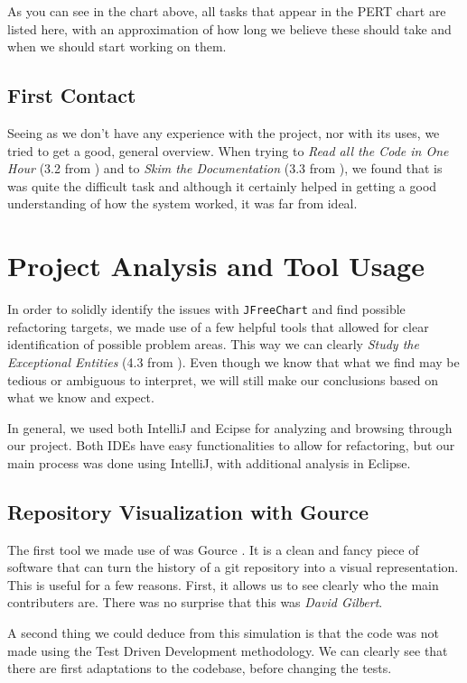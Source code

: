 \documentclass[11pt]{article}
\begin{document}
	As you can see in the chart above, all tasks that appear in the \textsf{PERT} chart are listed here, with an approximation of how long we believe these should take and when we should start working on them.
   
	
	\subsection{First Contact}
	Seeing as we don't have any experience with the project, nor with its uses, we tried to get a good, general overview. When trying to \textsl{Read all the Code in One Hour} (3.2 from \cite{demeyer2009object}) and to \textsl{Skim the Documentation} (3.3 from \cite{demeyer2009object}), we found that is was quite the difficult task and although it certainly helped in getting a good understanding of how the system worked, it was far from ideal.
	
	
	\section{Project Analysis and Tool Usage}
	In order to solidly identify the issues with \texttt{JFreeChart} and find possible refactoring targets, we made use of a few helpful tools that allowed for clear identification of possible problem areas. This way we can clearly \textsl{Study the Exceptional Entities} (4.3 from \cite{demeyer2009object}). Even though we know that what we find may be tedious or ambiguous to interpret, we will still make our conclusions based on what we know and expect.
	
	In general, we used both \textsf{IntelliJ} \cite{intellij} and \textsf{Ecipse} \cite{eclipse} for analyzing and browsing through our project. Both IDEs have easy functionalities to allow for refactoring, but our main process was done using \textsf{IntelliJ}, with additional analysis in \textsf{Eclipse}.
	
	\subsection{Repository Visualization with Gource}
	\label{sec:gource}
	The first tool we made use of was \textsf{Gource} \cite{gource}. It is a clean and fancy piece of software that can turn the history of a git repository into a visual representation. This is useful for a few reasons. First, it allows us to see clearly who the main contributers are. There was no surprise that this was \textsl{David Gilbert}.
	
	A second thing we could deduce from this simulation is that the code was not made using the \textsf{Test Driven Development} methodology. We can clearly see that there are first adaptations to the codebase, before changing the tests.
	
\end{document}
